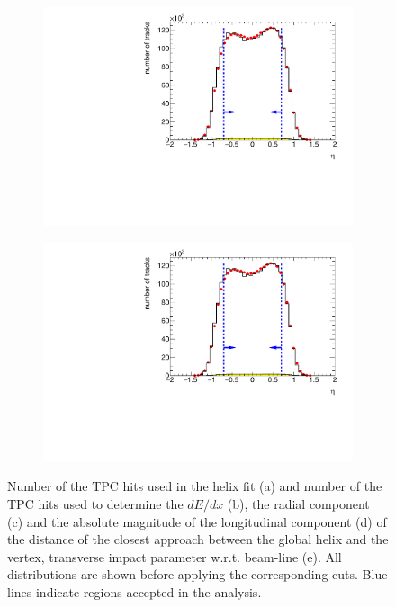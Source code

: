 \begin{figure}[b!]
\begin{subfigure}{.45\textwidth}
		\caption{}
	\end{subfigure}
	\begin{subfigure}{.45\textwidth}
		\includegraphics[width=\textwidth, page=6]{chapters/chrgSTAR/img/selection/SDT.pdf}
		\caption{}
	\end{subfigure}
	\begin{subfigure}{.45\textwidth}
		\includegraphics[width=\textwidth, page=11]{chapters/chrgSTAR/img/selection/SDT.pdf}
		\caption{}
	\end{subfigure}
	\begin{minipage}{.45\textwidth}
		
		
		\caption{Number of the  TPC hits used in the helix fit (a) and number of the  TPC hits used to determine the $dE/dx$ (b), the radial component (c) and the absolute magnitude of the longitudinal component (d) of the distance of the closest approach between  the global helix and the vertex, transverse impact parameter w.r.t. beam-line (e). All distributions are shown before applying  the corresponding cuts. Blue lines indicate regions accepted in the analysis.}
		\label{fig:dca_nhitsSTAR}
	\end{minipage}
\end{figure}

